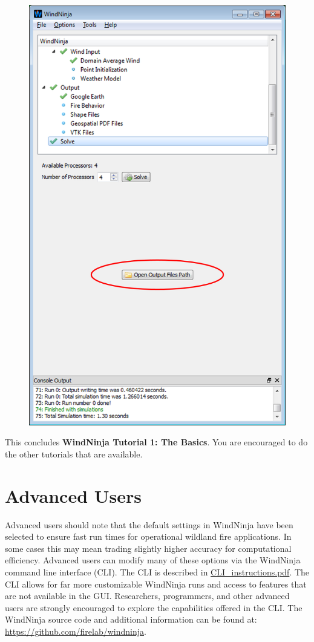 \documentclass[12pt]{article}
\begin{document}
\begin{figure}[H]
	\label{}
	\centering
	\includegraphics[scale=1.0]{output_path_1}
\end{figure}

This concludes \textbf{WindNinja Tutorial 1: The Basics}.  You are encouraged to do the other tutorials that are available.

\section{Advanced Users}

Advanced users should note that the default settings in WindNinja have been selected to ensure fast run times for operational wildland fire applications. In some cases this may mean trading slightly higher accuracy for computational efficiency.  Advanced users can modify many of these options via the WindNinja command line interface (CLI). The CLI is described in \href{http://firelab.github.io/windninja/pdf/CLI_instructions.pdf}{CLI\_instructions.pdf}. The CLI allows for far more customizable WindNinja runs and access to features that are not available in the GUI. Researchers, programmers, and other advanced users are strongly encouraged to explore the capabilities offered in the CLI. The WindNinja source code and additional information can be found at: \url{https://github.com/firelab/windninja}.
\end{document}

